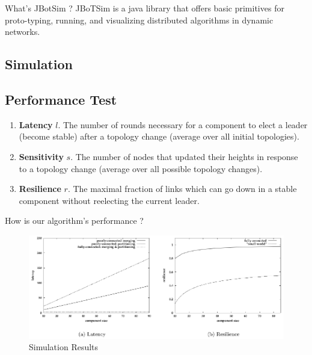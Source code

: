 \documentclass{beamer}
\begin{document}
\begin{frame}{What's JBotSim ?}
JBoTSim is a java library that offers basic primitives for proto-typing, running, and visualizing distributed algorithms in dynamic networks.
\end{frame}

\subsection{Simulation}
\begin{frame}





\end{frame}

\subsection{Performance Test}

\begin{frame}
	\begin{enumerate}
		\item \textbf{Latency} $l$. The number of rounds necessary for a component to elect a leader (become stable) after a topology change (average over all initial topologies).
		
		\item \textbf{Sensitivity} $s$. The number of nodes that updated their heights in response to a topology change (average over all possible topology changes).
		
		\item \textbf{Resilience} $r$. The maximal fraction of links which can go down in a stable component without reelecting the current leader.
		
	\end{enumerate}
\end{frame}
\begin{frame}{How is our algorithm's performance ?}
	\begin{figure}
		\centering
		\includegraphics[width=1\linewidth]{performance_test}
		\caption{Simulation Results}
		\label{fig:performancetest}
	\end{figure}
	
\end{frame}
\end{document}
